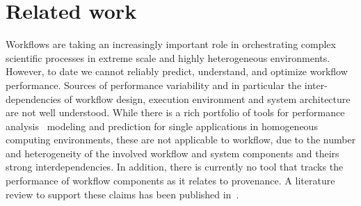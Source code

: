 \section{Related work}

Workflows are taking an increasingly important role in orchestrating complex scientific processes in extreme scale and highly heterogeneous environments. However, to date we cannot reliably predict, understand, and optimize workflow performance. Sources of performance variability and in particular the inter-dependencies of workflow design, execution environment and system architecture are not well understood. While there is a rich portfolio of tools for performance analysis~\cite{sonar, TAU, ScoreP, HPCToolkit} modeling and prediction for single applications in homogeneous computing environments, these are not applicable to workflow, due to the number and heterogeneity of the involved workflow and system components and theirs strong interdependencies. In addition, there is currently no tool that tracks the performance of workflow components as it relates to provenance. A literature review to support these claims has been published in~\cite{kerstin2015design}. 

